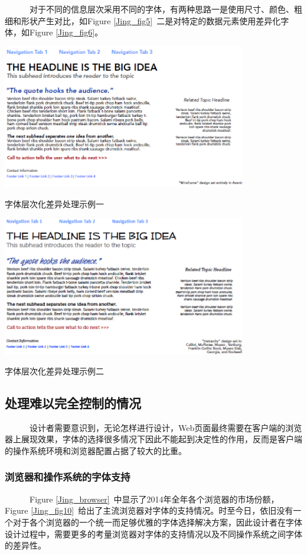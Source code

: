 \documentclass[a4paper]{article}
\begin{document}
~~~~~~对于不同的信息层次采用不同的字体，有两种思路一是使用尺寸、颜色、粗细和形状产生对比，如Figure \ref{Jing_fig5}~二是对特定的数据元素使用差异化字体，如Figure \ref{Jing_fig6}。

\makeatletter
\def\@captype{figure}
\makeatother
\includegraphics [width=0.8\textwidth]{Jing_fig5.png} 
\caption{字体层次化差异处理示例一}
\label{Jing_fig5}

\makeatletter
\def\@captype{figure}
\makeatother
\includegraphics [width=0.8\textwidth]{Jing_fig6.png} 
\caption{字体层次化差异处理示例二}
\label{Jing_fig6}

\subsection{处理难以完全控制的情况}

~~~~~~设计者需要意识到，无论怎样进行设计，Web页面最终需要在客户端的浏览器上展现效果，字体的选择很多情况下因此不能起到决定性的作用，反而是客户端的操作系统环境和浏览器配置占据了较大的比重。

\subsubsection{浏览器和操作系统的字体支持}
	
	~~~~~~Figure \ref{Jing_browser}~中显示了2014年全年各个浏览器的市场份额，Figure \ref{Jing_fig10}~给出了主流浏览器对字体的支持情况。时至今日，依旧没有一个对于各个浏览器的一个统一而足够优雅的字体选择解决方案，因此设计者在字体设计过程中，需要更多的考量浏览器对字体的支持情况以及不同操作系统之间字体的差异性。
\end{document}
